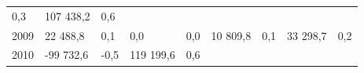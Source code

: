 \begin{longtable}[]{@{}lllllllll@{}}
\begin{minipage}[t]{0.06\columnwidth}
0,3\strut
\end{minipage} & \begin{minipage}[t]{0.09\columnwidth}\raggedright
107 438,2\strut
\end{minipage} & \begin{minipage}[t]{0.06\columnwidth}\raggedright
0,6\strut
\end{minipage}\tabularnewline
\begin{minipage}[t]{0.05\columnwidth}\raggedright
2009\strut
\end{minipage} & \begin{minipage}[t]{0.10\columnwidth}\raggedright
22 488,8\strut
\end{minipage} & \begin{minipage}[t]{0.06\columnwidth}\raggedright
0,1\strut
\end{minipage} & \begin{minipage}[t]{0.16\columnwidth}\raggedright
0,0\strut
\end{minipage} & \begin{minipage}[t]{0.06\columnwidth}\raggedright
0,0\strut
\end{minipage} & \begin{minipage}[t]{0.12\columnwidth}\raggedright
10 809,8\strut
\end{minipage} & \begin{minipage}[t]{0.06\columnwidth}\raggedright
0,1\strut
\end{minipage} & \begin{minipage}[t]{0.09\columnwidth}\raggedright
33 298,7\strut
\end{minipage} & \begin{minipage}[t]{0.06\columnwidth}\raggedright
0,2\strut
\end{minipage}\tabularnewline
\begin{minipage}[t]{0.05\columnwidth}\raggedright
2010\strut
\end{minipage} & \begin{minipage}[t]{0.10\columnwidth}\raggedright
-99 732,6\strut
\end{minipage} & \begin{minipage}[t]{0.06\columnwidth}\raggedright
-0,5\strut
\end{minipage} & \begin{minipage}[t]{0.16\columnwidth}\raggedright
119 199,6\strut
\end{minipage} & \begin{minipage}[t]{0.06\columnwidth}\raggedright
0,6\strut
\end{minipage} & \begin{minipage}[t]{0.12\columnwidth}\raggedright

\end{minipage}
\end{longtable}
